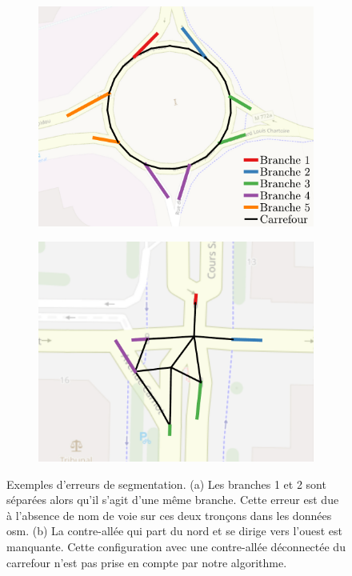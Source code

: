 \begin{figure}[ht]
    \centering
    \begin{subfigure}[t]{.4\linewidth}
        \centering
        \includegraphics[width=\linewidth]{images/evaluation/crseg/crseg_err_branches.pdf}
        \caption{}
    \end{subfigure}
    \begin{subfigure}[t]{.4\linewidth}
        \centering
        \includegraphics[width=\linewidth]{images/evaluation/crseg/crseg_err_manquant.pdf}
        \caption{}
    \end{subfigure}
    \caption[Exemples d'erreurs de segmentation]{Exemples d'erreurs de segmentation. (a) Les branches 1 et 2 sont séparées alors qu'il s'agit d'une même branche. Cette erreur est due à l'absence de nom de voie sur ces deux tronçons dans les données \gls{osm}. (b) La contre-allée qui part du nord et se dirige vers l'ouest est manquante. Cette configuration avec une contre-allée déconnectée du carrefour n'est pas prise en compte par notre algorithme.}
    \label{fig:eval_ex_err_crseg}
\end{figure}


